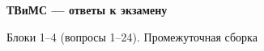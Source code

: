 \documentclass[11pt]{article}
\begin{document}
\begin{center}{\LARGE\bfseries ТВиМС — ответы к экзамену}\par
\vskip 4pt {\large Блоки 1–4 (вопросы 1–24). Промежуточная сборка}\par
\end{center}\vskip 10pt
\renewcommand{\contentsname}{Содержание}\tableofcontents\newpage







\end{document}
